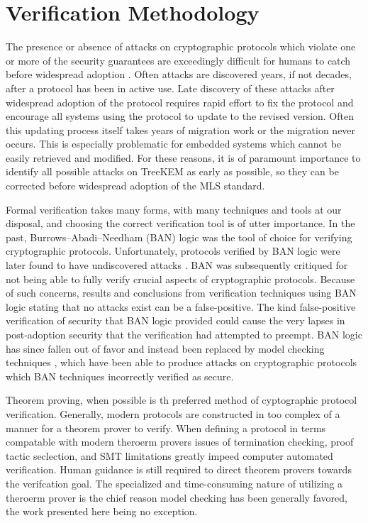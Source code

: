\hypertarget{sec:methodology}{%
\chapter{Verification Methodology}\label{sec:methodology}}

The presence or absence of attacks on cryptographic protocols which violate one or more of the security guarantees are exceedingly difficult for humans to catch before widespread adoption \autocite{clark1997survey}.
Often attacks are discovered years, if not decades, after a protocol has been in active use.
Late discovery of these attacks after widespread adoption of the protocol requires rapid effort to fix the protocol and encourage all systems using the protocol to update to the revised version.
Often this updating process itself takes years of migration work or the migration never occurs.
This is especially problematic for embedded systems which cannot be easily retrieved and modified.
For these reasons, it is of paramount importance to identify all possible attacks on TreeKEM as early as possible, so they can be corrected before widespread adoption of the MLS standard.

Formal verification takes many forms, with many techniques and tools at our disposal, and choosing the correct verification tool is of utter importance.
In the past, Burrows--Abadi--Needham (BAN) \autocite{burrows1989logic} logic was the tool of choice for verifying cryptographic protocols.
Unfortunately, protocols verified by BAN logic were later found to have undiscovered attacks \autocite{10.5555/188307.188350}.
BAN was subsequently critiqued for not being able to fully verify crucial aspects of cryptographic protocols.
Because of such concerns, results and conclusions from verification techniques using BAN logic stating that no attacks exist can be a false-positive.
The kind false-positive verification of security that BAN logic provided could cause the very lapses in post-adoption security that the verification had attempted to preempt.
BAN logic has since fallen out of favor and instead been replaced by model checking techniques \autocite{marrero1997model}, which have been able to produce attacks on cryptographic protocols which BAN techniques incorrectly verified as secure.

Theorem proving, when possible is th preferred method of cyptographic protocol verification.
Generally, modern protocols are constructed in too complex of a manner for a theorem prover to verify.
When defining a protocol in terms compatable with modern theroerm provers issues of termination checking, proof tactic seclection, and SMT limitations greatly impeed computer automated verification.
Human guidance is still required to direct theorem provers towards the verifcation goal.
The specialized and time-consuming nature of utilizing a theroerm prover is the chief reason model checking has been generally favored, the work presented here being no exception.

